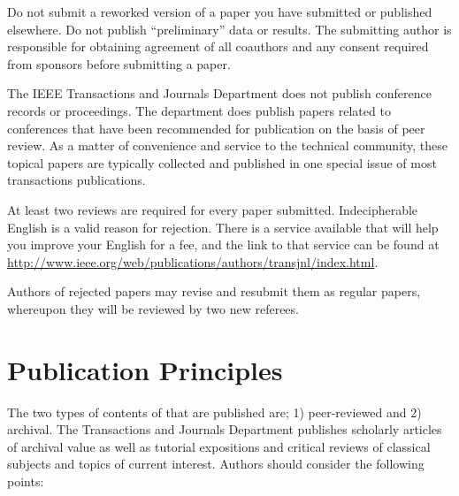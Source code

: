 \documentclass[journal]{IEEEtranTIE}
\begin{document}
Do not submit a reworked version of a paper you have submitted or published elsewhere. Do not publish ``preliminary'' data or results. The submitting author is responsible for obtaining agreement of all coauthors and any consent required from sponsors before submitting a paper.

The IEEE Transactions and Journals Department does not publish conference records or proceedings. The department  does publish papers related to conferences that have been recommended for publication on the basis of peer review. As a matter of convenience and service to the technical community, these topical papers are typically collected and published in one special issue of most transactions publications.

At least two reviews are required for every paper submitted. Indecipherable English is a valid reason for rejection. There is a service available that will help you improve your English for a fee, and the link to that service can be found at \url{http://www.ieee.org/web/publications/authors/transjnl/index.html}.

Authors of rejected papers may revise and resubmit them as regular papers, whereupon they will be reviewed by two new referees.

\section{Publication Principles}

The two types of contents of that are published are; 1) peer-reviewed and 2) archival. The Transactions and Journals Department publishes scholarly articles of archival value as well as tutorial expositions and critical reviews of classical subjects and topics of current interest.
Authors should consider the following points:
\end{document}
